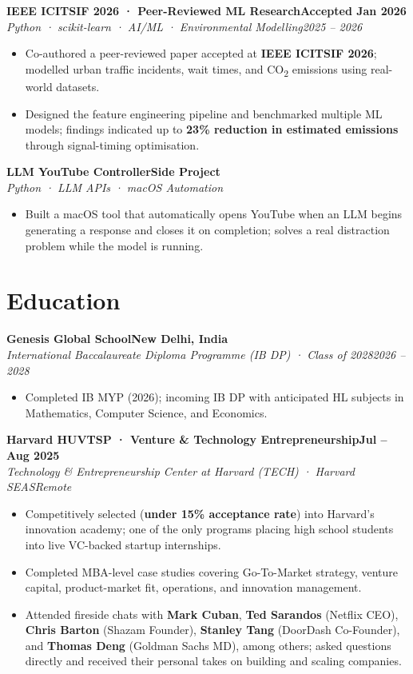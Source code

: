 \documentclass[10.4pt,letterpaper]{article}
\newcommand{\sub}[4]{%
  \vspace{2pt}%
  {\bfseries #1}\hfill{\bfseries\small #2}\\[-1pt]%
  \textit{\small #3}\hfill{\textit{\small #4}}%
  \vspace{1pt}%
}
\newenvironment{tlist}{%
  \begin{itemize}[leftmargin=1.3em, nosep, topsep=2pt, itemsep=0.5pt]%
  \small%
}{%
  \end{itemize}%
}
\begin{document}
\vspace{3pt}
\sub{IEEE ICITSIF 2026 · Peer-Reviewed ML Research}{Accepted Jan 2026}{Python · scikit-learn · AI/ML · Environmental Modelling}{2025 – 2026}
\begin{tlist}
  \item Co-authored a peer-reviewed paper accepted at \textbf{IEEE ICITSIF 2026}; modelled urban traffic incidents, wait times, and CO\textsubscript{2} emissions using real-world datasets.
  \item Designed the feature engineering pipeline and benchmarked multiple ML models; findings indicated up to \textbf{23\% reduction in estimated emissions} through signal-timing optimisation.
\end{tlist}

\vspace{3pt}
\sub{LLM YouTube Controller}{Side Project}{Python · LLM APIs · macOS Automation}{}
\begin{tlist}
  \item Built a macOS tool that automatically opens YouTube when an LLM begins generating a response and closes it on completion; solves a real distraction problem while the model is running.
\end{tlist}

\section{Education}

\sub{Genesis Global School}{New Delhi, India}{International Baccalaureate Diploma Programme (IB DP) · Class of 2028}{2026 – 2028}
\begin{tlist}
  \item Completed IB MYP (2026); incoming IB DP with anticipated HL subjects in Mathematics, Computer Science, and Economics.
\end{tlist}

\vspace{3pt}
\sub{Harvard HUVTSP · Venture \& Technology Entrepreneurship}{Jul – Aug 2025}{Technology \& Entrepreneurship Center at Harvard (TECH) · Harvard SEAS}{Remote}
\begin{tlist}
  \item Competitively selected (\textbf{under 15\% acceptance rate}) into Harvard's innovation academy; one of the only programs placing high school students into live VC-backed startup internships.
  \item Completed MBA-level case studies covering Go-To-Market strategy, venture capital, product-market fit, operations, and innovation management.
  \item Attended fireside chats with \textbf{Mark Cuban}, \textbf{Ted Sarandos} (Netflix CEO), \textbf{Chris Barton} (Shazam Founder), \textbf{Stanley Tang} (DoorDash Co-Founder), and \textbf{Thomas Deng} (Goldman Sachs MD), among others; asked questions directly and received their personal takes on building and scaling companies.
\end{tlist}
\end{document}
